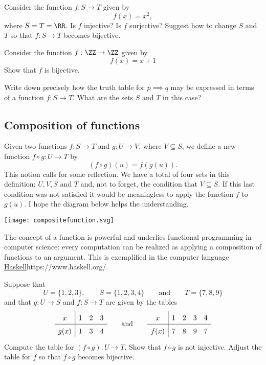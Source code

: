 \documentclass{article}
\begin{document}
\beginshex
Consider the function $f:S \rightarrow T$ given by
$$
f(x) = x^2,
$$
where $S = T = \RR$.
Is $f$ injective? Is $f$ surjective? Suggest how to change $S$ and $T$ so that $f:S\rightarrow T$ becomes
bijective.
\endshex

\beginshex
Consider the function $f:\ZZ \rightarrow \ZZ$ given by
$$
f(x) = x + 1
$$
Show that $f$ is bijective.
\endshex


\beginshex
Write down precisely how the truth table for $p\implies q$ may
be expressed in terms of a function $f: S\rightarrow T$. What are the sets $S$ and $T$ in this case?
\endshex


\subsection{Composition of functions}

Given two functions $f: S\rightarrow T$ and $g: U\rightarrow V$, where
$V\subseteq S$, we define a new function $f\circ g: U \rightarrow T$ by
$$
(f\circ g)(u) = f(g(u)).
$$
This notion calls for some reflection. We have a total of four sets
in this definition: $U, V, S$ and $T$ and, not to forget, the condition that
$V\subseteq S$. If this last condition was not satisfied it would be
meaningless to apply the function $f$ to $g(u)$.
I hope the diagram below helps the
understanding.

\texttt{[image: compositefunction.svg]}

\begin{remark}
  The concept of a function is powerful and underlies functional programming in computer science: every computation can be realized as applying a composition of functions to an argument. This is exemplified in the computer language
  \url{Haskell}{https://www.haskell.org/}.
  \end{remark}

\beginshex
Suppose that
$$
U = \{1, 2, 3\},\qquad S = \{1, 2, 3, 4\}\qquad\text{and}\qquad T = \{7, 8, 9\}
$$
and that $g: U \rightarrow S$ and $f: S\rightarrow T$ are given by the tables
$$
\def\arraystretch{1.5}
\begin{array}{c|ccccccc}
x & 1 & 2 & 3\\ \hline
g(x) & 1 & 3 & 4
\end{array}\qquad\text{and}\qquad
\begin{array}{c|ccccccc}
x & 1 & 2 & 3 & 4\\ \hline
f(x) & 7 & 8 & 9 & 7 
\end{array}
$$
Compute the table for $(f\circ g): U\rightarrow T$. Show that $f\circ g$ is not
injective. Adjust the table for $f$ so that $f\circ g$ becomes bijective.
\endshex
\end{document}

